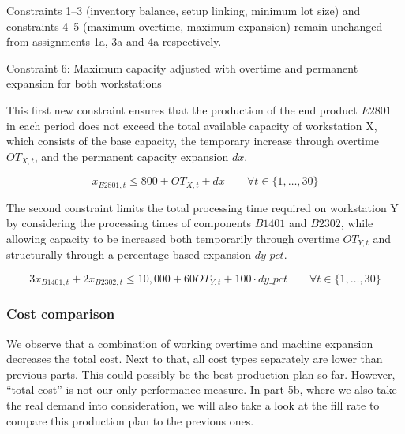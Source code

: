 \documentclass[a4paper,faculty=eb,language=en,doctype=article,sftitles=false]{ugent-doc}
\begin{document}
Constraints 1--3 (inventory balance, setup linking, minimum lot size) and constraints 4--5 (maximum overtime, maximum expansion) remain unchanged from assignments 1a, 3a and 4a respectively.

Constraint 6: Maximum capacity adjusted with overtime and permanent expansion for both workstations

This first new constraint ensures that the production of the end product \(E2801\) in each period does not exceed the total available capacity of workstation X, which consists of the base capacity, the temporary increase through overtime \(OT_{X,t}\), and the permanent capacity expansion \(dx\).

\[
x_{E2801,t} \leq 800 + OT_{X,t} + dx
\qquad
\forall t \in \{1,\ldots,30\}
\]

The second constraint limits the total processing time required on workstation Y by considering the processing times of components \(B1401\) and \(B2302\), while allowing capacity to be increased both temporarily through overtime \(OT_{Y,t}\) and structurally through a percentage-based expansion \(dy\_pct\).

\[
3x_{B1401,t} + 2x_{B2302,t}
\leq 10{,}000 + 60OT_{Y,t} + 100 \cdot dy\_pct
\qquad
\forall t \in \{1,\ldots,30\}
\]

\subsubsection{Cost comparison}

We observe that a combination of working overtime and machine expansion decreases the total cost. Next to that, all cost types separately are lower than previous parts. This could possibly be the best production plan so far. However, ``total cost'' is not our only performance measure. In part 5b, where we also take the real demand into consideration, we will also take a look at the fill rate to compare this production plan to the previous ones.
\end{document}
